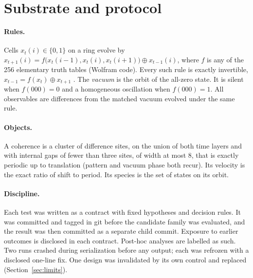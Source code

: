 \section{Substrate and protocol}
\paragraph{Rules.} Cells $x_t(i)\in\{0,1\}$ on a ring evolve by
$x_{t+1}(i)=f\big(x_t(i-1),x_t(i),x_t(i+1)\big)\oplus x_{t-1}(i)$, where $f$ is any of the 256
elementary truth tables (Wolfram code). Every such rule is exactly invertible,
$x_{t-1}=f(x_t)\oplus x_{t+1}$ \cite{toffoli1990,wolfram2002}. The \emph{vacuum} is the orbit of the
all-zero state. It is silent when $f(000)=0$ and a homogeneous oscillation when $f(000)=1$. All
observables are differences from the matched vacuum evolved under the same rule.

\paragraph{Objects.} A coherence is a cluster of difference sites, on the union of both time layers
and with internal gaps of fewer than three sites, of width at most 8, that is exactly periodic up to
translation (pattern and vacuum phase both recur). Its velocity is the exact ratio of shift to period.
Its species is the set of states on its orbit.

\paragraph{Discipline.} Each test was written as a contract with fixed hypotheses and decision rules.
It was committed and tagged in git before the candidate family was evaluated, and the result was then
committed as a separate child commit. Exposure to earlier outcomes is disclosed in each contract.
Post-hoc analyses are labelled as such. Two runs crashed during serialization before any output; each
was refrozen with a disclosed one-line fix. One design was invalidated by its own control and replaced
(Section~\ref{sec:limits}).
